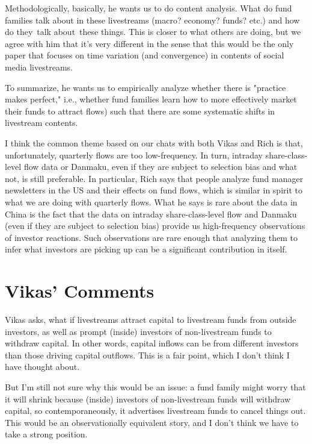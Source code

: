 \documentclass[12pt]{article}
\begin{document}
Methodologically, basically, he wants us to do content analysis. What do fund families talk about in these livestreams (macro? economy? funds? etc.) and how do they talk about these things. This is closer to what others are doing, but we agree with him that it's very different in the sense that this would be the only paper that focuses on time variation (and convergence) in contents of social media livestreams.

To summarize, he wants us to empirically analyze whether there is "practice makes perfect," i.e., whether fund families learn how to more effectively market their funds to attract flows) such that there are some systematic shifts in livestream contents.

I think the common theme based on our chats with both Vikas and Rich is that, unfortunately, quarterly flows are too low-frequency. In turn, intraday share-class-level flow data or Danmaku, even if they are subject to selection bias and what not, is still preferable. In particular, Rich says that people analyze fund manager newsletters in the US and their effects on fund flows, which is similar in spirit to what we are doing with quarterly flows. What he says is rare about the data in China is the fact that the data on intraday share-class-level flow and Danmaku (even if they are subject to selection bias) provide us high-frequency observations of investor reactions. Such observations are rare enough that analyzing them to infer what investors are picking up can be a significant contribution in itself.


\section*{Vikas' Comments}

Vikas asks, what if livestreams attract capital to livestream funds from outside investors, as well as prompt (inside) investors of non-livestream funds to withdraw capital. In other words, capital inflows can be from different investors than those driving capital outflows. This is a fair point, which I don't think I have thought about.

But I'm still not sure why this would be an issue: a fund family might worry that it will shrink because (inside) investors of non-livestream funds will withdraw capital, so contemporaneously, it advertises livestream funds to cancel things out. This would be an observationally equivalent story, and I don't think we have to take a strong position.
\end{document}
